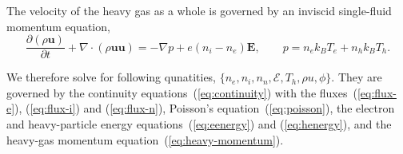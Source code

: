 The velocity of the heavy gas as a whole is governed by an inviscid single-fluid momentum equation,
\begin{equation}
\frac{\partial(\rho\mathbf{u})}{\partial t}+\nabla\cdot(\rho\mathbf{u}\mathbf{u})
=-\nabla p+e(n_i-n_e)\mathbf{E},
\qquad
p=n_ek_BT_e+n_hk_BT_h .
\label{eq:heavy-momentum}
\end{equation}

We therefore solve for following qunatities, \(\{n_e, n_i, n_n, \mathcal{E}, T_h, \rho u, \phi\}\). They are governed by the continuity equations~(\ref{eq:continuity}) with the fluxes~(\ref{eq:flux-e}), (\ref{eq:flux-i}) and (\ref{eq:flux-n}), Poisson's equation~(\ref{eq:poisson}), the electron and heavy-particle energy equations~(\ref{eq:eenergy}) and (\ref{eq:henergy}), and the heavy-gas momentum equation~(\ref{eq:heavy-momentum}).









